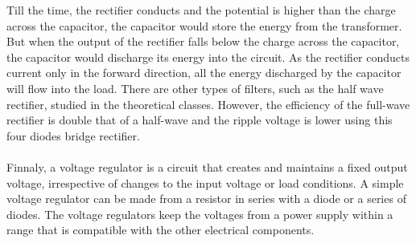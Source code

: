 Till the time, the rectifier conducts and the potential is higher than the charge across the capacitor, the capacitor would store the energy from the transformer. But when the output of the rectifier falls below the charge across the capacitor, the capacitor would discharge its energy into the circuit. As the rectifier conducts current only in the forward direction, all the energy discharged by the capacitor will flow into the load. There are other types of filters, such as the half wave rectifier, studied in the theoretical classes. However, the efficiency of the full-wave rectifier is double that of a half-wave and the ripple voltage is lower using this four diodes bridge rectifier.

\paragraph{}
Finnaly, a voltage regulator is a circuit that creates and maintains a fixed output voltage, irrespective of changes to the input voltage or load conditions. A simple voltage regulator can be made from a resistor in series with a diode or a series of diodes. The voltage regulators keep the voltages from a power supply within a range that is compatible with the other electrical components.
